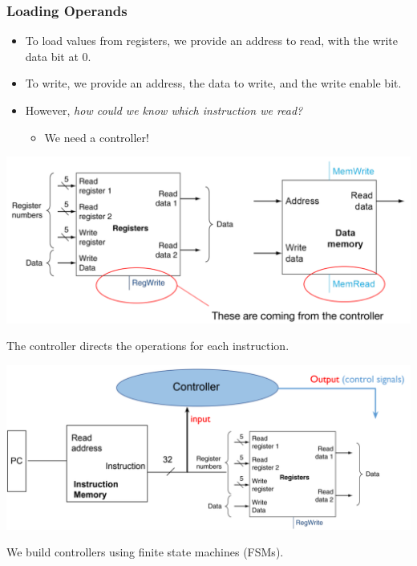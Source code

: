 \documentclass[10pt]{article}
\begin{document}
\subsubsection*{Loading Operands}
\begin{itemize}
    \item To load values from registers, we provide an address to read, with the write data bit at 0.  
    \item To write, we provide an address, the data to write, and the write enable bit.
    \item However, \textit{how could we know which instruction we read?}
    \begin{itemize}
        \item We need a controller!
    \end{itemize}
\end{itemize}
\begin{center}
    \includegraphics*[scale=0.5]{W2_4.png}
\end{center}
The controller directs the operations for each instruction.
\begin{center}
    \includegraphics*[scale=0.6]{W2_5.png}
\end{center}
We build controllers using finite state machines (FSMs).
\end{document}
